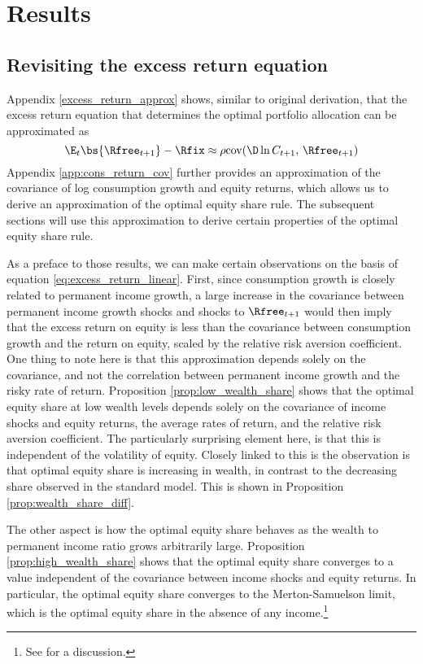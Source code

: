 \section{Results}\label{results}

\subsection{Revisiting the excess return equation}

Appendix \ref{excess_return_approx} shows, similar to  original derivation, that the excess return equation that determines the optimal portfolio allocation can be approximated as
\begin{equation}\label{eq:excess_return_linear}
    \E_{t}\bs{\Rfree_{t+1}} - \Rfix \approx \rho\text{cov}(\D \ln C_{t+1},\,\Rfree_{t+1})
\end{equation}
Appendix \ref{app:cons_return_cov} further provides an approximation of the covariance of log consumption growth and equity returns, which allows us to derive an approximation of the optimal equity share rule. The subsequent sections will use this approximation to derive certain properties of the optimal equity share rule.

As a preface to those results, we can make certain observations on the basis of equation \eqref{eq:excess_return_linear}. First, since consumption growth is closely related to permanent income growth, a large increase in the covariance between permanent income growth shocks and shocks to $\Rfree_{t+1}$ would then imply that the excess return on equity is less than the covariance between consumption growth and the return on equity, scaled by the relative risk aversion coefficient. One thing to note here is that this approximation depends solely on the covariance, and not the correlation between permanent income growth and the risky rate of return. Proposition \ref{prop:low_wealth_share} shows that the optimal equity share at low wealth levels depends solely on the covariance of income shocks and equity returns, the average rates of return, and the relative risk aversion coefficient. The particularly surprising element here, is that this is independent of the volatility of equity. Closely linked to this is the observation is that optimal equity share is increasing in wealth, in contrast to the decreasing share observed in the standard model. This is shown in Proposition \ref{prop:wealth_share_diff}.

The other aspect is how the optimal equity share behaves as the wealth to permanent income ratio grows arbitrarily large. Proposition \ref{prop:high_wealth_share} shows that the optimal equity share converges to a value independent of the covariance between income shocks and equity returns. In particular, the optimal equity share converges to the Merton-Samuelson limit, which is the optimal equity share in the absence of any income.\footnote{See \citet{Carroll2024} for a discussion.}

